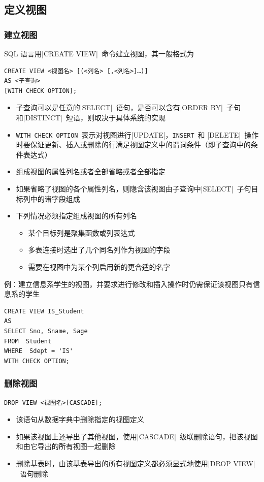 \subsection{定义视图}

\subsubsection{建立视图}
SQL 语言用\sverb|CREATE VIEW|\ 命令建立视图，其一般格式为
\begin{lstlisting}
CREATE VIEW <视图名> [(<列名> [,<列名>]…)]
AS <子查询>
[WITH CHECK OPTION];
\end{lstlisting}

\begin{itemize}
    \item 子查询可以是任意的\sverb|SELECT|\ 语句，是否可以含有\sverb|ORDER BY|\ 子句和\sverb|DISTINCT|\ 短语，则取决于具体系统的实现
    \item \verb|WITH CHECK OPTION|\ 表示对视图进行\sverb|UPDATE|，\verb|INSERT|\ 和 \sverb|DELETE|\ 操作时要保证更新、插入或删除的行满足视图定义中的谓词条件（即子查询中的条件表达式）
    \item 组成视图的属性列名或者全部省略或者全部指定
    \item 如果省略了视图的各个属性列名，则隐含该视图由子查询中\sverb|SELECT|\ 子句目标列中的诸字段组成
    \item 下列情况必须指定组成视图的所有列名
    \begin{itemize}
        \item 某个目标列是聚集函数或列表达式
        \item 多表连接时选出了几个同名列作为视图的字段
        \item 需要在视图中为某个列启用新的更合适的名字
    \end{itemize}
\end{itemize}

例：建立信息系学生的视图，并要求进行修改和插入操作时仍需保证该视图只有信息系的学生
\begin{lstlisting}
CREATE VIEW IS_Student
AS 
SELECT Sno, Sname, Sage
FROM  Student
WHERE  Sdept = 'IS'
WITH CHECK OPTION;
\end{lstlisting}

\subsubsection{删除视图}
\begin{lstlisting}
DROP VIEW <视图名>[CASCADE];
\end{lstlisting}
\begin{itemize}
    \item 该语句从数据字典中删除指定的视图定义
    \item 如果该视图上还导出了其他视图，使用\sverb|CASCADE|\ 级联删除语句，把该视图和由它导出的所有视图一起删除 
    \item 删除基表时，由该基表导出的所有视图定义都必须显式地使用\sverb|DROP VIEW|\ 语句删除 
\end{itemize}

